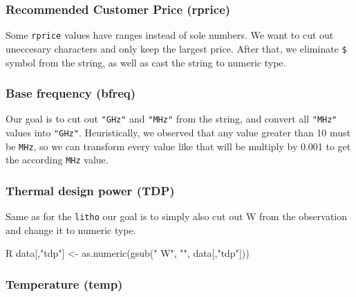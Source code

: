 \subsubsection*{Recommended Customer Price (rprice)}


Some \verb|rprice| values have ranges instead of sole numbers. We want to cut out uneccesary characters and only keep the largest price.
After that, we eliminate \verb|$| symbol from the string, as well as cast the string to numeric type.

\subsubsection*{Base frequency (bfreq)}


Our goal is to cut out \verb|"GHz"| and \verb|"MHz"| from the string, and convert all \verb|"MHz"| values into \verb|"GHz"|. Heuristically,
we observed that any value greater than 10 must be \verb|MHz|, so we can transform every value like that will be multiply by 0.001 to get 
the according \verb|MHz| value.

\subsubsection*{Thermal design power (TDP)}
Same as for the \verb|litho| our goal is to simply also cut out W from the observation and change it to numeric type.

\begin{code}{R}
data[,"tdp"] <- as.numeric(gsub(" W", "", data[,"tdp"]))    
\end{code}

\subsubsection*{Temperature (temp)}


